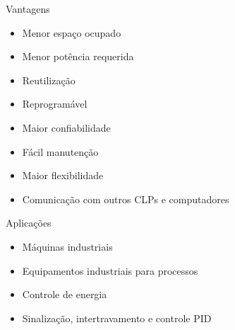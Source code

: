 \documentclass[aspectratio=169,
				xcolor=table]{beamer}
\begin{document}
	\begin{frame}{Vantagens}
		\begin{itemize}
	
			\item Menor espaço ocupado
			\vspace{.4em}
			\item Menor potência requerida
			\vspace{.4em}
			\item Reutilização
			\vspace{.4em}
			\item Reprogramável
			\vspace{.4em}
			\item Maior confiabilidade
			\vspace{.4em}
			\item Fácil manutenção
			\vspace{.4em}
			\item Maior flexibilidade
			\vspace{.4em}
			\item Comunicação com outros CLPs e computadores
	
		\end{itemize}
	\end{frame}

	\begin{frame}{Aplicações}
		\begin{itemize}
			\item Máquinas industriais
			\vspace{1em}
			\item Equipamentos industriais para processos
			\vspace{1em}
			\item Controle de energia
			\vspace{1em}
			\item Sinalização, intertravamento e controle PID

		\end{itemize}
	\end{frame}
\end{document}
